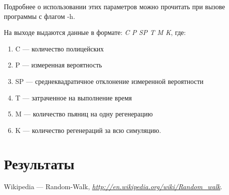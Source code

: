 \documentclass{article}
\begin{document}
    Подробнее о использовании этих параметров можно прочитать при вызове программы с флагом -h.

    На выходе выдаются данные в формате: \textit{C P SP T M K}, где:
    \begin{enumerate}[]
        \item C — количество полицейских
        \item P — измеренная вероятность
        \item SP — среднеквадратичное отклонение измеренной вероятности
        \item T — затраченное на выполнение время
        \item M — количество пьяниц на одну регенерацию
        \item K — количество регенераций за всю симуляцию.

    \end{enumerate}

    \pagebreak

    \section{Результаты}
    

    \pagebreak

    \begin{thebibliography}{9}

      Wikipedia — Random-Walk,
      \emph{\url{http://en.wikipedia.org/wiki/Random_walk}}.
      
    \end{thebibliography}
\end{document}
